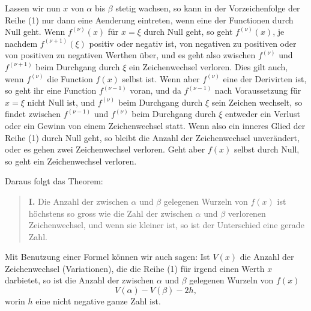 \documentclass[11pt]{article}
\begin{document}
Lassen wir nun $x$ von $\alpha$ bis $\beta$ stetig wachsen, so kann in der Vorzeichenfolge der Reihe (1) nur dann eine Aenderung eintreten, wenn eine der Functionen durch Null geht. Wenn $f^{(\nu)}(x)$ für $x=\xi$ durch Null geht, so geht $f^{(\nu)}(x)$, je nachdem $f^{(\nu+1)}(\xi)$ positiv oder negativ ist, von negativen zu positiven oder von positiven zu negativen Werthen über, und es geht also zwischen $f^{(\nu)}$ und $f^{(\nu+1)}$ beim Durchgang durch $\xi$ ein Zeichenwechsel verloren. Dies gilt auch, wenn $f^{(\nu)}$ die Function $f(x)$ selbst ist. Wenn aber $f^{(\nu)}$ eine der Derivirten ist, so geht ihr eine Function $f^{(\nu-1)}$ voran, und da $f^{(\nu-1)}$ nach Voraussetzung für $x=\xi$ nicht Null ist, und $f^{(\nu)}$ beim Durchgang durch $\xi$ sein Zeichen wechselt, so findet zwischen $f^{(\nu-1)}$ und $f^{(\nu)}$ beim Durchgang durch $\xi$ entweder ein Verlust oder ein Gewinn von einem Zeichenwechsel statt. Wenn also ein inneres Glied der Reihe (1) durch Null geht, so bleibt die Anzahl der Zeichenwechsel unverändert, oder es gehen zwei Zeichenwechsel verloren. Geht aber $f(x)$ selbst durch Null, so geht ein Zeichenwechsel verloren.

Daraus folgt das Theorem:

\begin{quote}
\textbf{I.} Die Anzahl der zwischen $\alpha$ und $\beta$ gelegenen Wurzeln von $f(x)$ ist höchstens so gross wie die Zahl der zwischen $\alpha$ und $\beta$ verlorenen Zeichenwechsel, und wenn sie kleiner ist, so ist der Unterschied eine gerade Zahl.
\end{quote}

Mit Benutzung einer Formel können wir auch sagen: Ist $V(x)$ die Anzahl der Zeichenwechsel (Variationen), die die Reihe (1) für irgend einen Werth $x$ darbietet, so ist die Anzahl der zwischen $\alpha$ und $\beta$ gelegenen Wurzeln von $f(x)$
\begin{equation}
        V(\alpha)-V(\beta)-2h,
\tag{2}
\end{equation}
worin $h$ eine nicht negative ganze Zahl ist.
\end{document}
